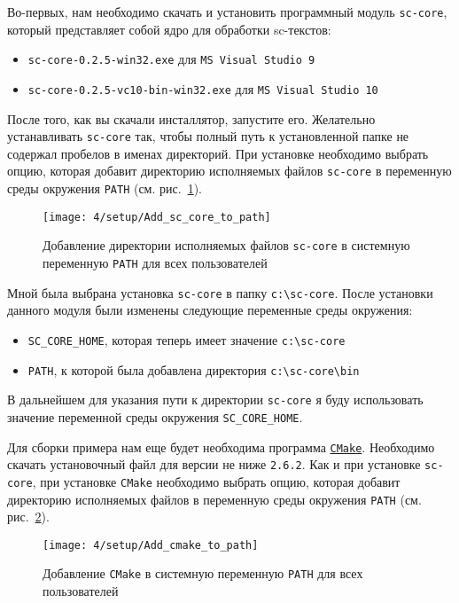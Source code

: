 Во-первых, нам необходимо скачать и установить программный модуль
\texttt{sc-core}, который представляет собой ядро для обработки
sc-текстов:

\begin{itemize}
\item \verb|sc-core-0.2.5-win32.exe| для \texttt{MS Visual Studio 9}
\item \verb|sc-core-0.2.5-vc10-bin-win32.exe| для \texttt{MS Visual Studio 10}
\end{itemize}

После того, как вы скачали инсталлятор, запустите его. Желательно
устанавливать \texttt{sc-core} так, чтобы полный путь к установленной
папке не содержал пробелов в именах директорий. При установке
необходимо выбрать опцию, которая добавит директорию исполняемых
файлов \texttt{sc-core} в переменную среды окружения \verb|PATH|
(см. рис.~\ref{fig:Add_sc_core_to_path}).

\begin{figure}[h!]
  \centering
  \texttt{[image: 4/setup/Add\_sc\_core\_to\_path]}
  \caption{Добавление директории исполняемых файлов \texttt{sc-core} в
    системную переменную \texttt{PATH} для всех пользователей}
  \label{fig:Add_sc_core_to_path}
\end{figure}
 
Мной была выбрана установка \texttt{sc-core} в папку
\verb|c:\sc-core|. После установки данного модуля были изменены
следующие переменные среды окружения:

\begin{itemize}
\item \verb|SC_CORE_HOME|, которая теперь имеет значение
  \verb|c:\sc-core|
\item \verb|PATH|, к которой была добавлена директория
  \verb|c:\sc-core\bin|
\end{itemize}

В дальнейшем для указания пути к директории \texttt{sc-core} я буду
использовать значение переменной среды окружения \verb|SC_CORE_HOME|.

Для сборки примера нам еще будет необходима программа
\texttt{\href{http://www.cmake.org/}{CMake}}. Необходимо скачать
установочный файл для версии не ниже \texttt{2.6.2}. Как и при
установке \texttt{sc-core}, при установке \texttt{CMake} необходимо
выбрать опцию, которая добавит директорию исполняемых файлов в
переменную среды окружения \verb|PATH|
(см. рис.~\ref{fig:Add_cmake_to_path}).
 
\begin{figure}[h]
  \centering
  \texttt{[image: 4/setup/Add\_cmake\_to\_path]}
  \caption{Добавление \texttt{CMake} в системную переменную
    \texttt{PATH} для всех пользователей}
  \label{fig:Add_cmake_to_path}
\end{figure}

